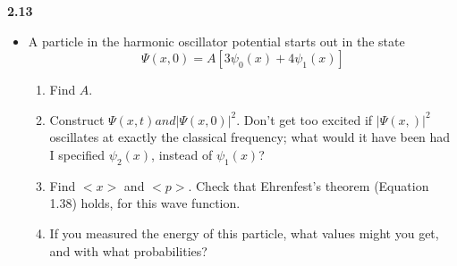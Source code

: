 \documentclass[fleqn]{article}
\begin{document}
  \textbf{2.13}
  \begin{itemize}
    \item A particle in the harmonic oscillator potential starts out in the state 
    $$\Psi(x, 0)=A \left[3\psi_0(x)+4\psi_1(x)\right]$$ 
    \begin{enumerate}
      \item Find $A$.

      \item Construct $\Psi(x, t) and |\Psi(x, 0)|^2$. Don't get too excited if $|\Psi(x, )|^2$ oscillates 
      at exactly the classical frequency; what would it have been had I specified $\psi_2(x)$, instead of
      $\psi_1(x)$?

      \item Find $<x>$ and $<p>$. Check that Ehrenfest's theorem (Equation 1.38) holds, for this wave function.

      \item If you measured the energy of this particle, what values might you get, and with what probabilities?


\end{enumerate}
\end{itemize}
\end{document}
